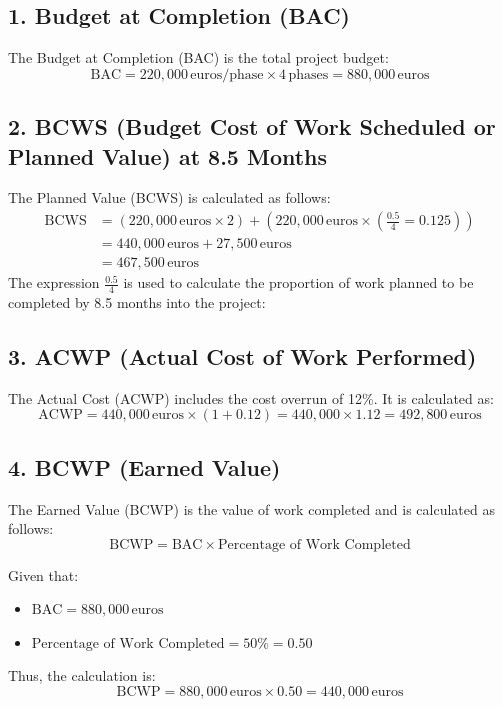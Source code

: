 \documentclass[12pt]{article} %
\begin{document}
\subsection*{1. Budget at Completion (BAC)}
The Budget at Completion (BAC) is the total project budget:
\[
\text{BAC} = 220,000 \, \text{euros/phase} \times 4 \, \text{phases} = 880,000 \, \text{euros}
\]

\subsection*{2. BCWS (Budget Cost of Work Scheduled or Planned Value) at 8.5 Months}
The Planned Value (BCWS) is calculated as follows:
\begin{align*}
\text{BCWS} & = (220,000 \, \text{euros} \times 2) + \left( 220,000 \, \text{euros} \times \left( \frac{0.5}{4}=0.125 \right) \right) \\
& = 440,000 \, \text{euros} + 27,500 \, \text{euros} \\
& = 467,500 \, \text{euros}
\end{align*}
The expression \( \frac{0.5}{4} \) is used to calculate the proportion of work planned to be completed by 8.5 months into the project:


\subsection*{3. ACWP (Actual Cost of Work Performed)}
The Actual Cost (ACWP) includes the cost overrun of 12\%. It is calculated as:
\[
\text{ACWP} = 440,000 \, \text{euros} \times (1 + 0.12) = 440,000 \times 1.12 = 492,800 \, \text{euros}
\]

\subsection*{4. BCWP (Earned Value)}

The Earned Value (BCWP) is the value of work completed and is calculated as follows:
\[
\text{BCWP} = \text{BAC} \times \text{Percentage of Work Completed}
\]

Given that:
\begin{itemize}
    \item \(\text{BAC} = 880,000 \, \text{euros}\)
    \item \(\text{Percentage of Work Completed} = 50\% = 0.50\)
\end{itemize}

Thus, the calculation is:
\[
\text{BCWP} = 880,000 \, \text{euros} \times 0.50 = 440,000 \, \text{euros}
\]
\end{document}
